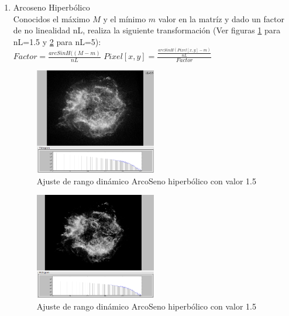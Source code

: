 \begin{enumerate}
		
		\item Arcoseno Hiperbólico\\
		Conocidos el máximo $M$ y el mínimo $m$ valor en la matríz y dado
		un factor de no linealidad nL, realiza la siguiente transformación  (Ver figuras \ref{fig:HDRasinh1_5} para nL=1.5 y \ref{fig:HDRasinh5} para nL=5):\\
			$Factor=\frac{arcSinH((M-m)}{nL}$
			$Pixel[x,y]=\frac{\frac{arcSinH(Pixel[x,y]-m)}{nL}}{Factor}$
			\begin{figure}[!htb]
				\centering
				\includegraphics[width=0.5\textwidth]{images/HDREQ/chandraaSinH_0_5.jpg}
				\caption{\label{fig:HDRasinh1_5}Ajuste de rango dinámico ArcoSeno hiperbólico con valor 1.5}
			\end{figure}
			\begin{figure}[!htb]
				\centering
				\includegraphics[width=0.5\textwidth]{images/HDREQ/chandraaSinH_5.PNG}
				\caption{\label{fig:HDRasinh5}Ajuste de rango dinámico ArcoSeno hiperbólico con valor 1.5}
			\end{figure}


\end{enumerate}
